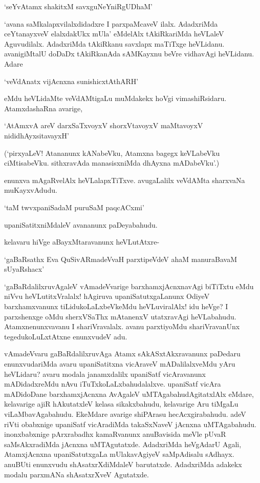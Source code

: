\begin{shloka}
`seYvAtamx shakitxM savxguNeYniRgUDhaM'
\end{shloka}

`avana saMkalapxvilalxdidadxre I parxpaMcaveV ilalx. AdadxriMda ceYtanayxveV elalxdakUkx mUla' eMdelAlx tAkiRkariMda heVLaleV Aguvudilalx. AdadxriMda tAkiRkanu savxlapx maTiTxge heVLidanu. avanigiMtalU doDaDx tAkiRkanAda sAMKayxnu beVre vidhavAgi heVLidanu. Adare

\begin{shloka}
`veVdAnatx vijAcnxna sunishicxtAthARH'
\end{shloka}

eMdu heVLidaMte veVdAMtigaLu muMdakekx hoVgi vimashiRsidaru. AtamxdashaRna avarige,

\begin{shloka}
`AtAmxvA areV darxSaTxvoyxV shorxVtavoyxV maMtavoyxV nididhAyxsitavayxH'
\end{shloka}

(`pirxyaLeV! Atananunx kANabeVku, Atamxna bagegx keVLabeVku ciMtisabeVku. sithxravAda manasisxniMda dhAyxna mADabeVku'.)

enunxva mAgaRvelAlx heVLalapxTiTxve. avugaLalilx veVdAMta sharxvaNa muKayxvAdudu.

\begin{shloka}
`taM twvxpaniSadaM puruSaM paqcACxmi'
\end{shloka}

upaniSatitxniMdaleV avananunx paDeyabahudu.

kelavaru hiVge aBayxMtaravanunx heVLutAtxre-

\begin{shloka}
`gaBaRsathx Eva QuSivARmadeVvaH parxtipeVdeV ahaM manuraBavaM sUyaRshacx'
\end{shloka}

`gaBaRdalilxruvAgaleV vAmadeVvarige barxhamxjAcnxnavAgi biTiTxtu eMdu niVvu heVLutitxVralalx! hAgiruva upaniSatutxgaLanunx OdiyeV barxhamxvanunx tiLidukoLaLxbeVkeMdu heVLuviralAlx! idu heVge? I parxshenxge oMdu sherxVSaThx mAtanenxV utatxravAgi heVLabahudu. Atamxnenunxvavanu I shariVravalalx. avanu parxtiyoMdu shariVravanUnx tegedukoLuLxtAtxne enunxvudeV adu.

vAmadeVvaru gaBaRdalilxruvAga Atamx sAkASxtAkxravanunx paDedaru enunxvudariMda avaru upaniSatitxna vicAraveV mADalilalxveMdu yAru heVLidaru? avaru modala janamxdalilx upaniSatf vicAravanunx mADidadxreMdu nAvu iTuTxkoLaLxbahudalalxve. upaniSatf vicAra mADidoDane barxhamxjAcnxna AvAgaleV uMTAgabahudAgitatxlAlx eMdare, kelavarige ajiR hAkutatxleV kelasa sikakxbahudu, kelavarige Aru tiMgaLu viLaMbavAgabahudu. EkeMdare avarige shiPArasu hecAcxgirabahudu. adeV riVti obabxnige upaniSatf vicAradiMda takaSxNaveV jAcnxna uMTAgabahudu. inonxbabxnige pArxrabadhx kamaRvanunx anuBavisida meVle pUvaR saMsAkxradiMda jAcnxna uMTAgutatxde. AdadxriMda heVgAdarU Agali, AtamxjAcnxna upaniSatutxgaLa mUlakavAgiyeV saMpAdisalu sAdhayx. anuBUti enunxvudu shAsatxrXdiMdaleV barutatxde. AdadxriMda adakekx modalu parxmANa shAsatxrXveV Agutatxde.

